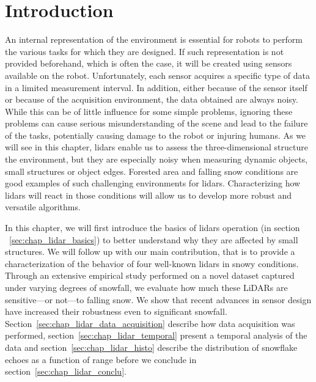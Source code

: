 \section{Introduction}
\label{sec:chap_lidar_intro}

An internal representation of the environment is essential for robots to perform the various tasks for which they are designed. If such representation is not provided beforehand, which is often the case, it will be created using sensors available on the robot. Unfortunately, each sensor acquires a specific type of data in a limited measurement interval. In addition, either because of the sensor itself or because of the acquisition environment, the data obtained are always noisy. While this can be of little influence for some simple problems, ignoring these problems can cause serious misunderstanding of the scene and lead to the failure of the tasks, potentially causing damage to the robot or injuring humans. As we will see in this chapter, \gls*{lidar}s enable us to assess the three-dimensional structure the environment, but they are especially noisy when measuring dynamic objects, small structures or object edges. Forested area and falling snow conditions are good examples of such challenging environments for \gls*{lidar}s. Characterizing how \gls*{lidar}s will react in those conditions will allow us to develop more robust and versatile algorithms.

In this chapter, we will first introduce the basics of \gls*{lidar}s operation (in section ~\ref{sec:chap_lidar_basics}) to better understand why they are affected by small structures. We will follow up with our main contribution, that is to provide a characterization of the behavior of four well-known \gls*{lidar}s in snowy conditions. Through an extensive empirical study performed on a novel dataset captured under varying degrees of snowfall, we evaluate how much these LiDARs are sensitive---or not---to falling snow. We show that recent advances in sensor design have increased their robustness even to significant snowfall. Section~\ref{sec:chap_lidar_data_acquisition} describe how data acquisition was performed, section~\ref{sec:chap_lidar_temporal} present a temporal analysis of the data and section~\ref{sec:chap_lidar_histo} describe the distribution of snowflake echoes as a function of range before we conclude in section~\ref{sec:chap_lidar_conclu}. 

